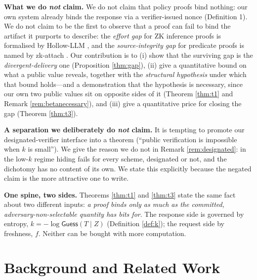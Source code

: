 \documentclass[journal]{IEEEtran}
\newcommand{\need}[1]{}
\newcommand{\fixme}[1]{}
\newcommand{\need}[1]{\textcolor{blue}{[[ NEED: #1 ]]}}
\newcommand{\fixme}[1]{\textcolor{orange}{[[ FIX: #1 ]]}}
\begin{document}
\noindent\textbf{What we do \emph{not} claim.}
We do not claim that policy proofs bind nothing: our own system already binds
the response via a verifier-issued nonce (Definition 1). We do not claim to be
the first to observe that a proof can fail to bind the artifact it purports to
describe: the \emph{effort gap} for ZK inference proofs is formalised by
Hollow-LLM \cite{hollowllm}, and the \emph{source-integrity gap} for predicate
proofs is named by zk-attach \cite{zkattach}. Our contribution is to
(i) show that the surviving gap is the \emph{divergent-delivery} one
(Proposition \ref{thm:gap}), (ii) give a quantitative bound on what a public
value reveals, together with the \emph{structural hypothesis} under which that
bound holds---and a demonstration that the hypothesis is necessary, since our
own two public values sit on opposite sides of it (Theorem \ref{thm:t1} and
Remark \ref{rem:betanecessary}), and (iii) give a quantitative price for
closing the gap (Theorem \ref{thm:t3}).

\smallskip
\noindent\textbf{A separation we deliberately do \emph{not} claim.} It is
tempting to promote our designated-verifier interface into a theorem
(``public verification is impossible when $k$ is small''). We give the reason
we do not in Remark \ref{rem:designated}: in the low-$k$ regime hiding fails
for every scheme, designated or not, and the dichotomy has no content of its
own. We state this explicitly because the negated claim is the more attractive
one to write.

\smallskip
\noindent\textbf{One spine, two sides.} Theorems \ref{thm:t1} and
\ref{thm:t3} state the same fact about two different inputs: \emph{a proof
binds only as much as the committed, adversary-non-selectable quantity has bits
for}. The response side is governed by entropy,
$k = -\log \mathsf{Guess}(T \mid Z)$ (Definition \ref{def:k}); the request side
by freshness, $f$. Neither can be bought with more computation.

\fixme{全文禁止出现"比 Proof-of-Guardrail 更强"或任何强弱对比。
Proof-of-Guardrail 与本文正交：它证"计算发生过"，本文证"性质成立"。}

\section{Background and Related Work}
\label{sec:related}

\need{五条线，每条都要"它占什么位 / 我们差在哪"两列。见 docs/tdsc-plan.md \S2。}
\end{document}
